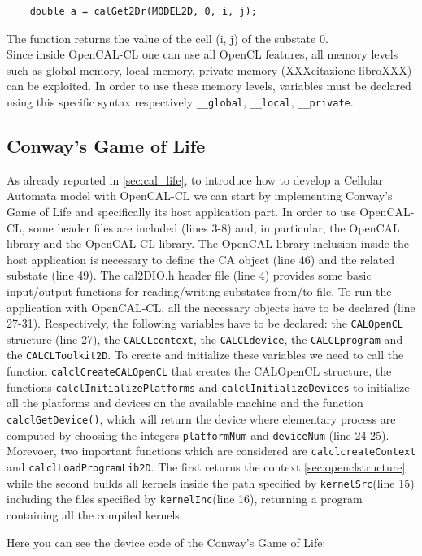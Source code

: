 \begin{lstlisting} 
	double a = calGet2Dr(MODEL2D, 0, i, j);
\end{lstlisting}

The function returns the value of the cell (i, j) of the substate 0.\\ Since inside OpenCAL-CL one can use all OpenCL features, all memory levels such as global memory, local memory, private
memory (XXXcitazione libroXXX) can be exploited. In order to use these memory levels, variables must be declared using this specific syntax respectively
\verb'__global', \verb'__local', \verb'__private'.

\subsection{Conway’s Game of Life}
 
As already reported in \ref{sec:cal_life}, to introduce how to develop a
Cellular Automata model with OpenCAL-CL we can start by implementing Conway’s
Game of Life and specifically its host application part. In order to use OpenCAL-CL, some
header files are included (lines 3-8) and, in particular, the OpenCAL library and
the OpenCAL-CL library. The OpenCAL library
inclusion inside the host application is necessary to define the CA object
(line 46) and the related substate (line 49). The cal2DIO.h header
file (line 4) provides some basic input/output functions for
reading/writing substates from/to file. To run the application with
OpenCAL-CL, all the necessary objects have to be declared (line
27-31). Respectively, the following variables have to be declared: the
\verb'CALOpenCL' structure (line 27), the \verb'CALCLcontext', the
\verb'CALCLdevice', the \verb'CALCLprogram' and the
\verb'CALCLToolkit2D'.  To create and initialize these variables we
need to call the function \verb'calclCreateCALOpenCL' that creates the
CALOpenCL structure, the functions \verb|calclInitializePlatforms| and
\verb|calclInitializeDevices| to initialize all the platforms and
devices on the available machine and the function \verb'calclGetDevice()', which
will return the device where elementary process are computed by
choosing the integers \verb'platformNum' and \verb'deviceNum' (line
24-25).  Morevoer, two important functions which are considered are \verb'calclcreateContext'
and \verb'calclLoadProgramLib2D'.  The first returns the context
\ref{sec:openclstructure}, while the second builds all kernels inside the
path specified by \verb'kernelSrc'(line 15) including the files
specified by \verb'kernelInc'(line 16), returning a program
containing all the compiled kernels.

 Here
you can see the device code of the Conway’s Game of Life:

 
